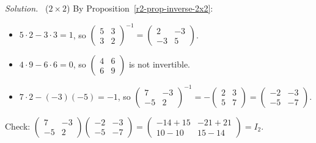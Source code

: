 \documentclass[12pt]{article}
\theoremstyle{definition}
\newenvironment{solution}{\par\noindent\textit{Solution.}\ }{\par\smallskip}
\begin{document}
\begin{solution}
(\(2\times2\)) By Proposition~\ref{r2-prop-inverse-2x2}:
\begin{itemize}
\item \(5\cdot2-3\cdot3=1\), so
\(\left(\begin{smallmatrix}5&3\\3&2\end{smallmatrix}\right)^{-1}
=\left(\begin{smallmatrix}2&-3\\-3&5\end{smallmatrix}\right)\).
\item \(4\cdot9-6\cdot6=0\), so
\(\left(\begin{smallmatrix}4&6\\6&9\end{smallmatrix}\right)\) is not invertible.
\item \(7\cdot2-(-3)(-5)=-1\), so
\(\left(\begin{smallmatrix}7&-3\\-5&2\end{smallmatrix}\right)^{-1}
=-\left(\begin{smallmatrix}2&3\\5&7\end{smallmatrix}\right)
=\left(\begin{smallmatrix}-2&-3\\-5&-7\end{smallmatrix}\right)\).
\end{itemize}
Check: \(\left(\begin{smallmatrix}7&-3\\-5&2\end{smallmatrix}\right)
\left(\begin{smallmatrix}-2&-3\\-5&-7\end{smallmatrix}\right)
=\left(\begin{smallmatrix}-14+15&-21+21\\10-10&15-14\end{smallmatrix}\right)=I_2\).


\end{solution}
\end{document}
